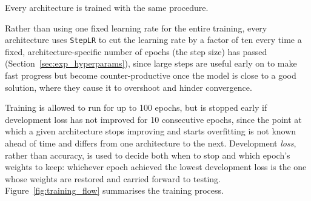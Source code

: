 Every architecture is trained with the same procedure.

Rather than using one fixed learning rate for the entire training, every architecture uses \texttt{StepLR} to cut the learning rate by a factor of ten every time a fixed, architecture-specific number of epochs (the step size) has passed (Section~\ref{sec:exp_hyperparams}), since large steps are useful early on to make fast progress but become counter-productive once the model is close to a good solution, where they cause it to overshoot and hinder convergence.

Training is allowed to run for up to 100 epochs, but is stopped early if development loss has not improved for 10 consecutive epochs, since the point at which a given architecture stops improving and starts overfitting is not known ahead of time and differs from one architecture to the next. Development \emph{loss}, rather than accuracy, is used to decide both when to stop and which epoch's weights to keep: whichever epoch achieved the lowest development loss is the one whose weights are restored and carried forward to testing. Figure~\ref{fig:training_flow} summarises the training process.



